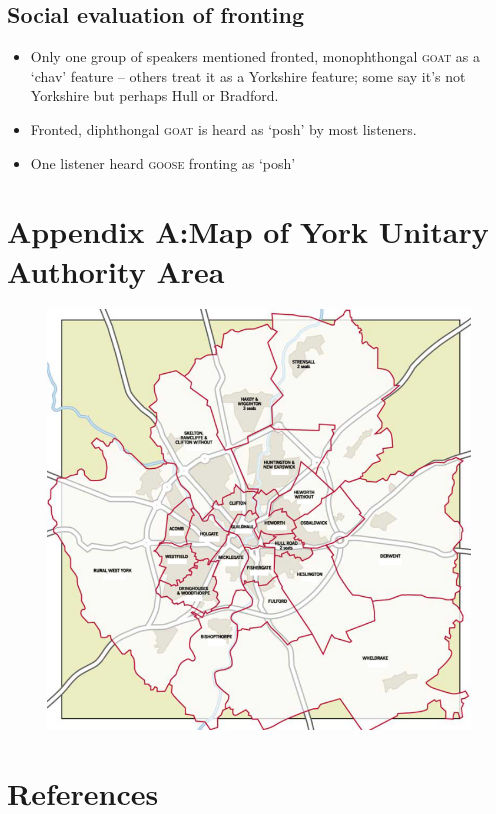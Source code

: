 \documentclass{article}
\begin{document}
\subsection*{Social evaluation of fronting}
\begin{itemize}
\item{Only one group of speakers mentioned fronted, monophthongal \textsc{goat} as a `chav' feature -- others treat it as a Yorkshire feature; some say it's not Yorkshire but perhaps Hull or Bradford.}
\item{Fronted, diphthongal \textsc{goat} is heard as `posh' by most listeners.}
\item{One listener heard \textsc{goose} fronting as `posh'}
\end{itemize}
\newpage
\section*{Appendix A:Map of York Unitary Authority Area}
\begin{figure}[!ht]
\hspace{-2cm}
\includegraphics[scale=0.75]{yorkmap.jpg}
\end{figure}
\section*{References}
\end{document}
